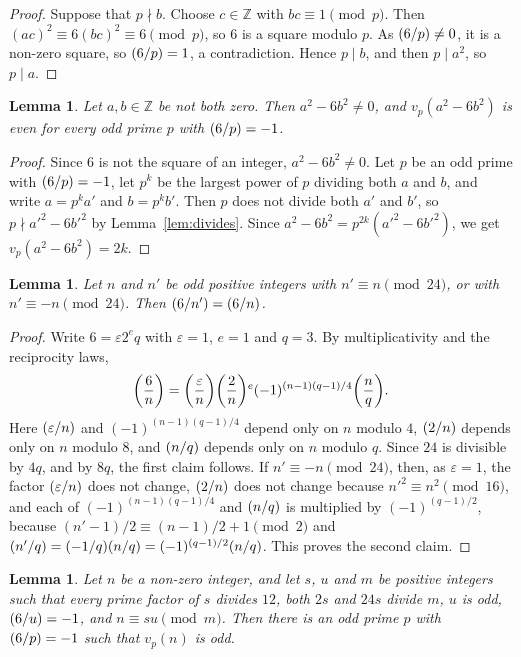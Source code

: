 \documentclass[11pt]{article}
\newtheorem{lemma}[theorem]{Lemma}
\newcommand{\Z}{\mathbb{Z}}
\newcommand{\leg}[2]{\mathchoice{\biggl(\dfrac{#1}{#2}\biggr)}{(#1/#2)}{(#1/#2)}{(#1/#2)}}
\begin{document}
\begin{proof}
Suppose that $p\nmid b$. Choose $c\in\Z$ with $bc\equiv1\pmod p$. Then $(ac)^2\equiv6(bc)^2\equiv6\pmod p$, so $6$ is a square modulo $p$. As $\leg{6}{p}\neq0$, it is a non-zero square, so $\leg{6}{p}=1$, a contradiction. Hence $p\mid b$, and then $p\mid a^2$, so $p\mid a$.
\end{proof}

\begin{lemma}\label{lem:even}
Let $a,b\in\Z$ be not both zero. Then $a^2-6b^2\neq0$, and $v_p(a^2-6b^2)$ is even for every odd prime $p$ with $\leg{6}{p}=-1$.
\end{lemma}

\begin{proof}
Since $6$ is not the square of an integer, $a^2-6b^2\neq0$. Let $p$ be an odd prime with $\leg{6}{p}=-1$, let $p^k$ be the largest power of $p$ dividing both $a$ and $b$, and write $a=p^ka'$ and $b=p^kb'$. Then $p$ does not divide both $a'$ and $b'$, so $p\nmid a'^2-6b'^2$ by Lemma~\ref{lem:divides}. Since $a^2-6b^2=p^{2k}(a'^2-6b'^2)$, we get $v_p(a^2-6b^2)=2k$.
\end{proof}

\begin{lemma}\label{lem:period}
Let $n$ and $n'$ be odd positive integers with $n'\equiv n\pmod{24}$, or with $n'\equiv-n\pmod{24}$. Then $\leg{6}{n'}=\leg{6}{n}$.
\end{lemma}

\begin{proof}
Write $6=\varepsilon2^eq$ with $\varepsilon=1$, $e=1$ and $q=3$. By multiplicativity and the reciprocity laws,
\[
\leg{6}{n}=\leg{\varepsilon}{n}\leg{2}{n}^e(-1)^{(n-1)(q-1)/4}\leg{n}{q}.
\]
Here $\leg{\varepsilon}{n}$ and $(-1)^{(n-1)(q-1)/4}$ depend only on $n$ modulo $4$, $\leg{2}{n}$ depends only on $n$ modulo $8$, and $\leg{n}{q}$ depends only on $n$ modulo $q$. Since $24$ is divisible by $4q$, and by $8q$, the first claim follows. If $n'\equiv-n\pmod{24}$, then, as $\varepsilon=1$, the factor $\leg{\varepsilon}{n}$ does not change, $\leg{2}{n}$ does not change because $n'^2\equiv n^2\pmod{16}$, and each of $(-1)^{(n-1)(q-1)/4}$ and $\leg{n}{q}$ is multiplied by $(-1)^{(q-1)/2}$, because $(n'-1)/2\equiv(n-1)/2+1\pmod 2$ and $\leg{n'}{q}=\leg{-1}{q}\leg{n}{q}=(-1)^{(q-1)/2}\leg{n}{q}$. This proves the second claim.
\end{proof}

\begin{lemma}\label{lem:odd}
Let $n$ be a non-zero integer, and let $s$, $u$ and $m$ be positive integers such that every prime factor of $s$ divides $12$, both $2s$ and $24s$ divide $m$, $u$ is odd, $\leg{6}{u}=-1$, and $n\equiv su\pmod m$. Then there is an odd prime $p$ with $\leg{6}{p}=-1$ such that $v_p(n)$ is odd.
\end{lemma}
\end{document}
